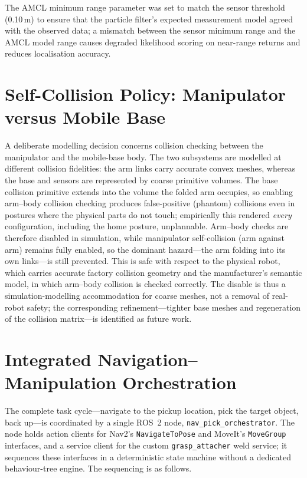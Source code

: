 The AMCL minimum range parameter was set to match the sensor threshold (0.10\,m) to
ensure that the particle filter's expected measurement model agreed with the observed
data; a mismatch between the sensor minimum range and the AMCL model range causes
degraded likelihood scoring on near-range returns and reduces localisation accuracy.

\section{Self-Collision Policy: Manipulator versus Mobile Base}
A deliberate modelling decision concerns collision checking between the manipulator and
the mobile-base body. The two subsystems are modelled at different collision fidelities:
the arm links carry accurate convex meshes, whereas the base and sensors are represented
by coarse primitive volumes. The base collision primitive extends into the volume the
folded arm occupies, so enabling arm--body collision checking produces false-positive
(phantom) collisions even in postures where the physical parts do not touch; empirically
this rendered \emph{every} configuration, including the home posture, unplannable.
Arm--body checks are therefore disabled in simulation, while manipulator self-collision
(arm against arm) remains fully enabled, so the dominant hazard---the arm folding into
its own links---is still prevented. This is safe with respect to the physical robot,
which carries accurate factory collision geometry and the manufacturer's semantic model,
in which arm--body collision is checked correctly. The disable is thus a
simulation-modelling accommodation for coarse meshes, not a removal of real-robot
safety; the corresponding refinement---tighter base meshes and regeneration of the
collision matrix---is identified as future work.

\section{Integrated Navigation--Manipulation Orchestration}
The complete task cycle---navigate to the pickup location, pick the target object,
back up---is coordinated by a single ROS~2 node, \texttt{nav\_pick\_orchestrator}.
The node holds action clients for Nav2's \texttt{NavigateToPose} and MoveIt's
\texttt{MoveGroup} interfaces, and a service client for the custom
\texttt{grasp\_attacher} weld service; it sequences these interfaces in a deterministic
state machine without a dedicated behaviour-tree engine. The sequencing is as follows.


